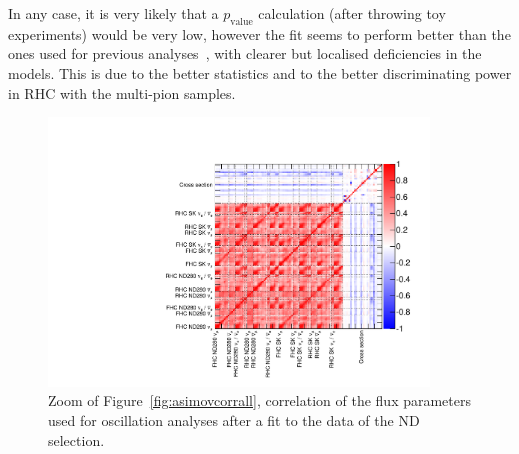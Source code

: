 In any case, it is very likely that a $p_\text{value}$ calculation
(after throwing toy experiments) would be very low, however the fit
seems to perform better than the ones used for previous
analyses~\cite{TN324}, with clearer but localised deficiencies in the
models. This is due to the better statistics and to the better
discriminating power in \Gls{RHC} with the multi-pion samples.

\begin{figure}[ht]
  \begin{center}
    \includegraphics[width=0.9\textwidth,page=4]{images/BANFF/OutputData_matrices.pdf}
    \caption[Correlation of the flux parameters used for oscillation
    analyses after a fit to the data of the ND280 selection]{Zoom of
      Figure~\ref{fig:asimovcorrall}, correlation of the flux
      parameters used for oscillation analyses after a fit to the data
      of the \Gls{ND} selection.}
    \label{fig:datacorrflux}
  \end{center}
\end{figure}

